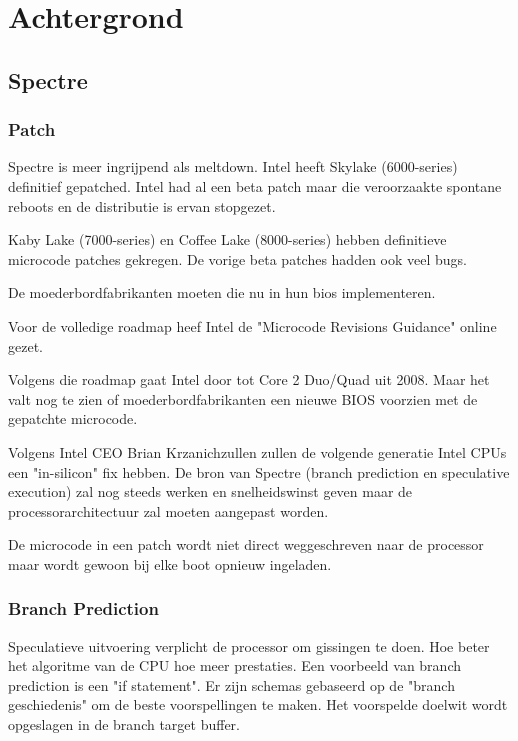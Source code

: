 
\chapter{Achtergrond}

\section{Spectre}

\subsection{Patch}
Spectre is meer ingrijpend als meltdown.
Intel heeft Skylake (6000-series) definitief gepatched.
Intel had al een beta patch maar die veroorzaakte spontane reboots en de distributie is ervan stopgezet.

Kaby Lake (7000-series) en Coffee Lake (8000-series) hebben definitieve microcode patches gekregen. De vorige beta patches hadden ook veel bugs.

De moederbordfabrikanten moeten die nu in hun bios implementeren.

Voor de volledige roadmap heef Intel de "Microcode Revisions Guidance" online gezet.

Volgens die roadmap gaat Intel door tot Core 2 Duo/Quad uit 2008.
Maar het valt nog te zien of moederbordfabrikanten een nieuwe BIOS voorzien met de gepatchte microcode.

Volgens Intel CEO Brian Krzanichzullen zullen de volgende generatie Intel CPUs een "in-silicon" fix hebben. De bron van Spectre (branch prediction en speculative execution) zal nog steeds werken en snelheidswinst geven maar de processorarchitectuur zal moeten aangepast worden.

De microcode in een patch wordt niet direct weggeschreven naar de processor maar wordt gewoon bij elke boot opnieuw ingeladen.


\subsection{Branch Prediction}
Speculatieve uitvoering verplicht de processor om gissingen te doen. Hoe beter het algoritme van de CPU hoe meer prestaties. Een voorbeeld van branch prediction is een "if statement". 
\parencite{Kocher}
Er zijn schemas gebaseerd op de "branch geschiedenis" om de beste voorspellingen te maken. Het voorspelde doelwit wordt opgeslagen in de branch target buffer.

